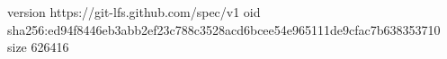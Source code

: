 version https://git-lfs.github.com/spec/v1
oid sha256:ed94f8446eb3abb2ef23c788c3528acd6bcee54e965111de9cfac7b638353710
size 626416
